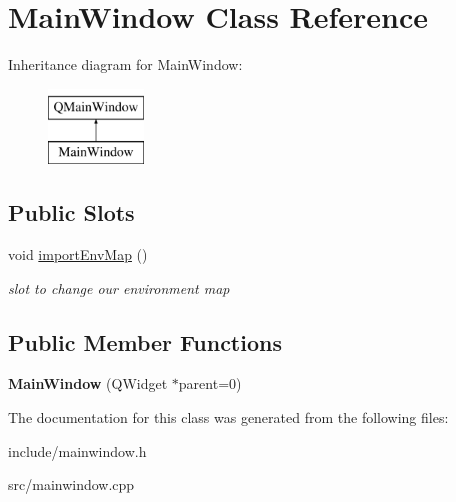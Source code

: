 \hypertarget{class_main_window}{\section{Main\-Window Class Reference}
\label{class_main_window}
}
Inheritance diagram for Main\-Window\-:\begin{figure}[H]
\begin{center}
\leavevmode
\includegraphics[height=2.000000cm]{class_main_window}
\end{center}
\end{figure}
\subsection*{Public Slots}
\begin{DoxyCompactItemize}
\item 
\hypertarget{class_main_window_a0ba57a99a109b440f8fa0c4cc05096c7}{void \hyperlink{class_main_window_a0ba57a99a109b440f8fa0c4cc05096c7}{import\-Env\-Map} ()}\label{class_main_window_a0ba57a99a109b440f8fa0c4cc05096c7}

\begin{DoxyCompactList}\small\item\em slot to change our environment map \end{DoxyCompactList}\end{DoxyCompactItemize}
\subsection*{Public Member Functions}
\begin{DoxyCompactItemize}
\item 
\hypertarget{class_main_window_a8b244be8b7b7db1b08de2a2acb9409db}{{\bfseries Main\-Window} (Q\-Widget $\ast$parent=0)}\label{class_main_window_a8b244be8b7b7db1b08de2a2acb9409db}

\end{DoxyCompactItemize}


The documentation for this class was generated from the following files\-:\begin{DoxyCompactItemize}
\item 
include/mainwindow.\-h\item 
src/mainwindow.\-cpp\end{DoxyCompactItemize}

